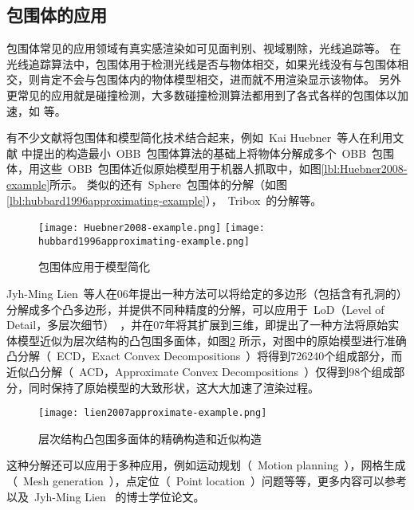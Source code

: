 \subsection{包围体的应用}

包围体常见的应用领域有真实感渲染如可见面判别、视域剔除\cite{assarsson2000optimized}，光线追踪\cite{wald2007ray}等。
在光线追踪算法中，包围体用于检测光线是否与物体相交，如果光线没有与包围体相交，则肯定不会与包围体内的物体模型相交，进而就不用渲染显示该物体。
另外更常见的应用就是碰撞检测\cite{wangzhiqiang1999}，大多数碰撞检测算法都用到了各式各样的包围体以加速，如
 等。

有不少文献将包围体和模型简化技术结合起来，例如~Kai Huebner~等人\cite{huebner2008minimum}在利用文献
中提出的构造最小~OBB~包围体算法的基础上将物体分解成多个~OBB~包围体，用这些~OBB~包围体近似原始模型用于机器人抓取中，如图\ref{lbl:Huebner2008-example}所示。
类似的还有~Sphere~包围体的分解\cite{hubbard1996approximating}（如图\ref{lbl:hubbard1996approximating-example}），~Tribox~的分解\cite{crosnier1999tribox}等。

\begin{figure}[htbp]
  \centering
    {\texttt{[image: Huebner2008-example.png]}}
    {\texttt{[image: hubbard1996approximating-example.png]}}
  \caption{包围体应用于模型简化}
  \label{lbl:bounding-voluems-used-in-shape-approximation}
\end{figure}

Jyh-Ming Lien~\cite{lien2006approximate2d}等人在06年提出一种方法可以将给定的多边形（包括含有孔洞的）分解成多个凸多边形，并提供不同种精度的分解，可以应用于~LoD（Level of
Detail，多层次细节）~，并在07年将其扩展到三维\cite{lien2007approximate3d}，即提出了一种方法将原始实体模型近似为层次结构的凸包围多面体，如图\ref{lbl:lien2007approximate-example}
所示，对图中的原始模型进行准确凸分解（~ECD，Exact Convex
Decompositions~）将得到726240个组成部分，而近似凸分解（~ACD，Approximate Convex
Decompositions~）仅得到98个组成部分，同时保持了原始模型的大致形状，这大大加速了渲染过程。

\begin{figure}[htbp]
\centering
\texttt{[image: lien2007approximate-example.png]}
\caption{层次结构凸包围多面体的精确构造和近似构造\cite{lien2007approximate3d}}
\label{lbl:lien2007approximate-example}
\end{figure}
这种分解还可以应用于多种应用，例如运动规划（~Motion planning~），网格生成（~Mesh generation~），点定位（~Point location~）问题等等，更多内容可以参考\cite{lien2008approximate} 以及~Jyh-Ming Lien~ 的博士学位论文\cite{lien2006approximatephd}。

